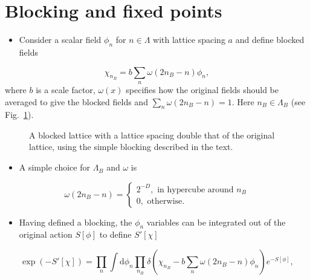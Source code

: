 \newpage



\section{Blocking and fixed points}

\begin{itemize}
    \item Consider a scalar field $\phi_n$ for $n \in \Lambda$ with lattice spacing $a$ and define blocked fields
\end{itemize}
\begin{equation}
    \chi_{n_B} = b \sum_n \omega (2 n_B - n) \phi_n,
\end{equation}
where $b$ is a scale factor, $\omega(x)$ specifies how the original fields should be averaged to give the blocked fields and $\sum_n \omega(2n_B - n) = 1.$ Here $n_B \in \Lambda_B$ (see Fig.~\ref{fig:block}).
\begin{figure}
\caption{A blocked lattice with a lattice spacing double that of the original lattice, using the simple blocking described in the text.}
\label{fig:block}
\end{figure}
\begin{itemize}
    \item A simple choice for $\Lambda_B$ and $\omega$ is
\end{itemize}
\begin{equation}
    \omega(2 n_B - n) = \begin{cases}
        2^{-D}, \text{ in hypercube around } n_B \\
        0, \text{ otherwise.}
    \end{cases}
\end{equation}
\begin{itemize}
    \item Having defined a blocking, the $\phi_n$ variables can be integrated out of the original action $S[\phi]$ to define $S'[\chi]$
\end{itemize}
\begin{equation}
\label{eq:blocking_action}
    \exp(-S'[\chi]) = \prod_n \int \text{d}\phi_n \prod_{n_B}\delta\left(\chi_{n_B} - b \sum_n \omega(2 n_B - n) \phi_n \right)e^{-S[\phi]},
\end{equation}
